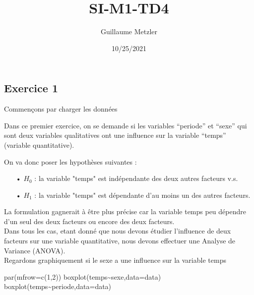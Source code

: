 \documentclass[
]{article}
\title{SI-M1-TD4}
\author{Guillaume Metzler}
\date{10/25/2021}
\newenvironment{Shaded}{\begin{snugshade}}{\end{snugshade}}
\newcommand{\AttributeTok}[1]{\textcolor[rgb]{0.77,0.63,0.00}{#1}}
\newcommand{\DecValTok}[1]{\textcolor[rgb]{0.00,0.00,0.81}{#1}}
\newcommand{\FunctionTok}[1]{\textcolor[rgb]{0.00,0.00,0.00}{#1}}
\newcommand{\NormalTok}[1]{#1}
\newcommand{\OtherTok}[1]{\textcolor[rgb]{0.56,0.35,0.01}{#1}}
\newcommand{\SpecialCharTok}[1]{\textcolor[rgb]{0.00,0.00,0.00}{#1}}
\newcommand{\StringTok}[1]{\textcolor[rgb]{0.31,0.60,0.02}{#1}}
\begin{document}
\maketitle

\hypertarget{exercice-1}{%
\subsection{Exercice 1}\label{exercice-1}}

Commençons par charger les données

\begin{Shaded}
\end{Shaded}

Dans ce premier exercice, on se demande si les variables ``periode'' et
``sexe'' qui sont deux variables qualitatives ont une influence sur la
variable ``temps'' (variable quantitative).

On va donc poser les hypothèses suivantes :

\begin{itemize}
\item[•] $H_0$ : la variable "temps" est indépendante des deux autres facteurs v.s.
\item[•] $H_1$ : la variable "temps" est dépendante d'au moins un des autres facteurs.
\end{itemize}

La formulation gagnerait à être plus précise car la variable temps peu
dépendre d'un seul des deux facteurs ou encore des deux facteurs.\\

Dans tous les cas, etant donné que nous devons étudier l'influence de
deux facteurs sur une variable quantitative, nous devons effectuer une
Analyse de Variance (ANOVA).\\

Regardons graphiquement si le sexe a une influence sur la variable temps

\begin{Shaded}
\begin{Highlighting}[]
\FunctionTok{par}\NormalTok{(}\AttributeTok{mfrow=}\FunctionTok{c}\NormalTok{(}\DecValTok{1}\NormalTok{,}\DecValTok{2}\NormalTok{)) }
\FunctionTok{boxplot}\NormalTok{(temps}\SpecialCharTok{\textasciitilde{}}\NormalTok{sexe,}\AttributeTok{data=}\NormalTok{data) }
\FunctionTok{boxplot}\NormalTok{(temps}\SpecialCharTok{\textasciitilde{}}\NormalTok{periode,}\AttributeTok{data=}\NormalTok{data)}
\end{Highlighting}
\end{Shaded}
\end{document}
